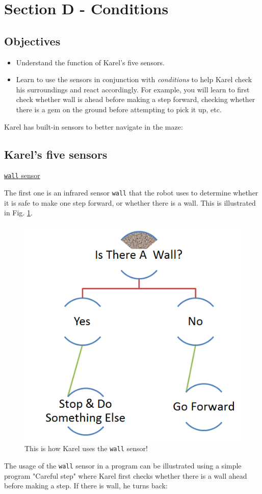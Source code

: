 \documentclass[article,A4,12pt]{llncs}
\begin{document}
{{{{\section{Section D - Conditions}

\subsection{Objectives} 

\begin{itemize}
\item Understand the function of Karel's five sensors.
\item Learn to use the sensors in conjunction with {\em conditions} to help Karel 
      check his surroundings and react accordingly. For example, you will learn to first 
      check whether wall is ahead before making a step forward, checking whether there
      is a gem on the ground before attempting to pick it up, etc.
\end{itemize}

\noindent
Karel has built-in sensors to better navigate in the maze:

\subsection{Karel's five sensors}

\noindent
\underline{{\tt wall} sensor}

The first one is an infrared sensor {\tt wall} that the robot uses to determine 
whether it is safe to make one step forward, or whether there is a wall. This is 
illustrated in Fig. \ref{fig:dede-ifelse}.

\begin{figure}[!ht]
\begin{center}
\includegraphics[height=0.4\textwidth]{img/salih-ifelse.png}
\end{center}
\vspace{-4mm}
\caption{This is how Karel uses the {\tt wall} sensor!}
\label{fig:dede-ifelse}
\end{figure}
\noindent
The usage of the {\tt wall} sensor in a program can be illustrated using a simple program "Careful step" 
where Karel first checks whether there is a wall ahead before
making a step. If there is wall, he turns back: 

}}}}
\end{document}
